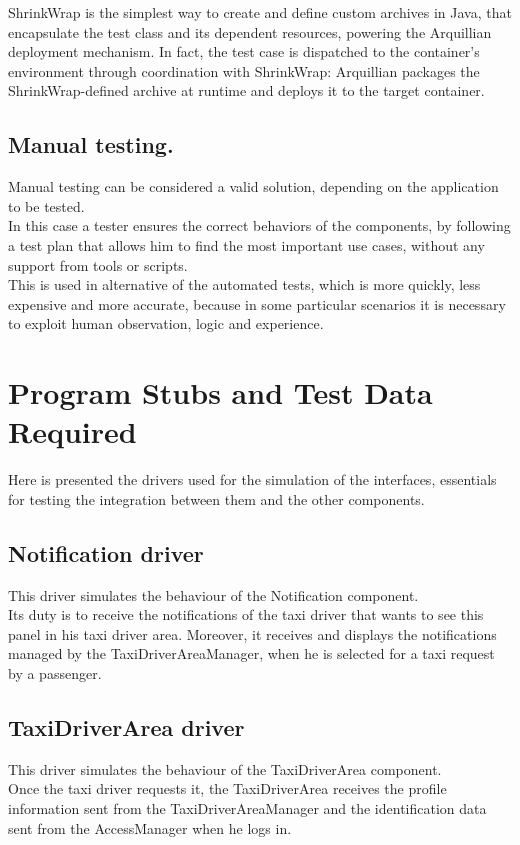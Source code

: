 \documentclass[18pt,oneside,a4paper, titlepage]{article}
\begin{document}
			
		\vspace{0.5cm}
			
		ShrinkWrap is the simplest way to create and define custom archives in Java, that encapsulate the test class and its dependent resources, powering the Arquillian deployment mechanism. In fact, the test case is dispatched to the container's environment through coordination with ShrinkWrap: Arquillian packages the ShrinkWrap-defined archive at runtime and deploys it to the target container.
		
	\subsection{Manual testing.}
		Manual testing can be considered a valid solution, depending on the application to be tested.\\ In this case a tester ensures the correct behaviors of the components, by following a test plan that allows him to find the most important use cases, without any support from tools or scripts.\\ This is used in alternative of the automated tests, which is more quickly, less expensive and more accurate, because in some particular scenarios it is necessary to exploit human observation, logic and experience.

\newpage
\section{Program	Stubs	and	Test	Data	Required}
	Here is presented the drivers used for the simulation of the interfaces, essentials for testing the integration between them and the other components.
	\subsection{Notification driver}
		This driver simulates the behaviour of the Notification component.\\ Its duty is to receive the notifications of the taxi driver that wants to see this panel in his taxi driver area. Moreover, it receives and displays the notifications managed by the TaxiDriverAreaManager, when he is selected for a taxi request by a passenger.
	\subsection{TaxiDriverArea driver}
		This driver simulates the behaviour of the TaxiDriverArea component.\\ Once the taxi driver requests it, the TaxiDriverArea receives the profile information sent from the TaxiDriverAreaManager and the identification data sent from the AccessManager when he logs in.
\end{document}
